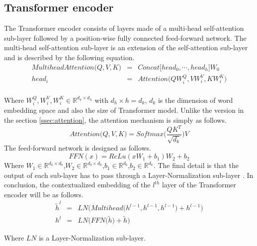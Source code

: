 \subsection{Transformer encoder}
The Transformer encoder consists of layers made of a multi-head self-attention sub-layer followed by a position-wise fully connected feed-forward network. The multi-head self-attention sub-layer is an extension of the self-attention sub-layer and is described by the following equation.
\begin{equation}
\begin{array}{rcl}
MultiheadAttention\big( Q,V,K \big) &=& Concat \big[ head_0, \cdots , head_h \big] W_0\\
head_i &=& Attention \big( QW_i^Q, VW_i^V, KW_i^K \big)\\
\end{array}
\end{equation}

Where $W_i^Q, W_i^V, W_i^K \in \mathbb{R}^{d_k \times d_h}$ with $d_h \times h = d_k$, $d_k$ is the dimension of word embedding space and also the size of Transformer model. Unlike the version in the section \ref{ssec:attention}, the attention mechanism is simply as follows.
\begin{equation}
Attention\big( Q, V, K \big) = Softmax\big(\frac{Q K^T}{\sqrt{d_k}} \big) V
\end{equation}
The feed-forward network is designed as follows.
\begin{equation}
FFN(x) = ReLu(xW_1+b_1)W_2+b_2
\end{equation}
Where $W_1 \in \mathbb{R}^{d_k \times d_b}$,$W_2 \in \mathbb{R}^{d_b \times d_k}$,$b_1 \in \mathbb{R}^{d_b}$,$b_2 \in \mathbb{R}^{d_k}$.
The final detail is that the output of each sub-layer has to pass through a Layer-Normalization sub-layer \citep{Jimmy16layer}. In conclusion, the contextualized embedding of the $l^{th}$ layer of the Transformer encoder will be as follows.
\begin{equation}
\begin{array}{rcl}
\tilde{h}^l &=& LN\bigg(Multihead\big(h^{l-1}, h^{l-1}, h^{l-1}\big) + h^{l-1}\bigg) \\ 
h^l &=& LN\bigg(FFN\big(\tilde{h}\big) + \tilde{h}\bigg)
\end{array}
\end{equation}

Where $LN$ is a Layer-Normalization sub-layer.
